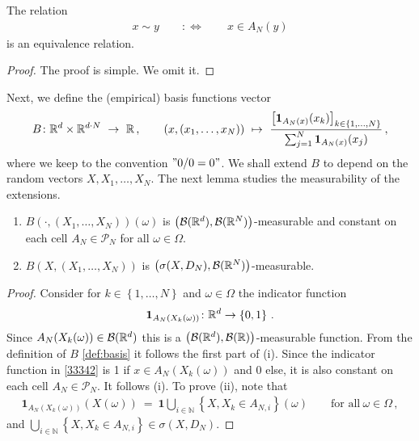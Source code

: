 \begin{lemma}
  \label{lem:basis_equiv_r}
  The relation
  \begin{align*}
    x\sim y
    \qquad
    :\Leftrightarrow
    \qquad
    x\in A_N(y)
  \end{align*}
  is an equivalence relation.
\end{lemma}
\begin{proof}
  The proof is simple. We omit it.
\end{proof}
Next, we define the (empirical) basis functions vector
\begin{align}
  \label{def:basis}
  B\colon
  \R^d\times \R^{d\cdot N}
  \ 
  \to
  \ 
  \R
  \,,
  \qquad
  (x,(x_1,\ldots,x_N))
  \ 
  \mapsto
  \ 
  \frac
  {
    \left[
    \mathbf{1}
    _{
      A_N(x)
    }
    (x_k)
    \right]
    _{k\in \left\{
        1,\ldots,N
    \right\}}
  }
  {
    \sum_{j=1}^N
    \mathbf{1}
    _{
      A_N(x)
    }
    (x_j)
    }
  \,,
\end{align}
where we keep to the convention $"0/0=0"$.
We shall extend $B$ to depend on the random vectors
$X,X_1,\ldots,X_N$.
The next lemma studies the measurability of the extensions.
\begin{lemma}
  \label{lem:basis_meas}
  \quad
  \begin{enumerate}[label=(\roman*)]
\item
  $B(\cdot,(X_1,\ldots,X_N))(\omega)$ is 
  $\left(
    \mathcal{B}(\mathbb{R}^d),\mathcal{B}(\mathbb{R}^N)
  \right)$-measurable
  and
  constant on each cell 
  $A_N\in\mathcal{P}_N$
  for all $\omega\in\Omega$. 
\item
  $B(X,(X_1,\ldots,X_N))$ is $\left(
    \sigma(X,D_N),\mathcal{B}(\mathbb{R}^N)
  \right)$-measurable. 
  \end{enumerate}
\end{lemma}
%
\begin{proof}
Consider
for $k\in \left\{
  1,\ldots,N
\right\}$
and $\omega\in\Omega$
the indicator function
\begin{align}
  \label{33342}
  \mathbf{1}
  _
  {A_N(X_k(\omega))}
  \colon \mathbb{R}^d\to \left\{
    0,1
  \right\}
  \,.
\end{align}
Since 
$
  {A_N(X_k(\omega))}
  \in\mathcal{B}(\mathbb{R}^d)
$
this is a 
  $\left(
    \mathcal{B}(\mathbb{R}^d),\mathcal{B}(\mathbb{R})
  \right)$-measurable
  function.
  From the definition of $B$ \eqref{def:basis} it follows the first part of (i).
  Since the indicator function in \eqref{33342} is 1 if $
  x\in
  {A_N(X_k(\omega))}
  $
  and 0 else, it is also constant on each cell
  $A_N\in\mathcal{P}_N$.
  It follows (i).
  To prove (ii), note that
\begin{align*}
  \mathbf{1}
  _
  {A_N(X_k(\omega))}(X(\omega))
  \ 
  =
  \ 
  \mathbf{1}
  \bigcup_{i\in\mathbb{N}}
  \left\{
    X,X_k \in A_{N,i}
  \right\}
  (\omega)
  \qquad
  \text{for all}\ 
  \omega\in\Omega
  \,,
\end{align*}
and
$
  \bigcup_{i\in\mathbb{N}}
  \left\{
    X,X_k \in A_{N,i}
  \right\}
  \in\sigma(X,D_N)
  $.
\end{proof}
